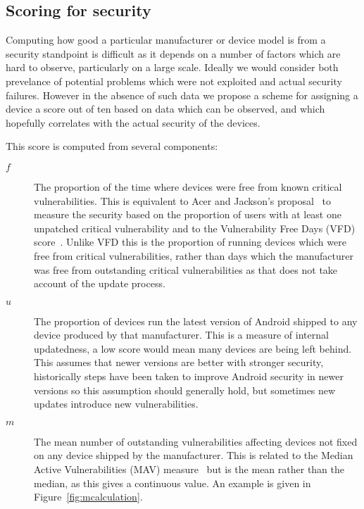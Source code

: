 \subsection{Scoring for security}
\label{sec:security_scoring}

Computing how good a particular manufacturer or device model is from a security standpoint is difficult as it depends on a number of factors which are hard to observe, particularly on a large scale.
Ideally we would consider both prevelance of potential problems which were not exploited and actual security failures.
However in the absence of such data we propose a scheme for assigning a device a score out of ten based on data which can be observed, and which hopefully correlates with the actual security of the devices.

This score is computed from several components:
\begin{description}
  \item[$f$] The proportion of the time where devices were free from known critical vulnerabilities. This is equivalent to Acer and Jackson's proposal~\cite{Acer2010} to measure the security based on the proportion of users with at least one unpatched critical vulnerability and to the Vulnerability Free Days (VFD) score~\cite{Wright2014}.
  Unlike VFD this is the proportion of running devices which were free from critical vulnerabilities, rather than days which the manufacturer was free from outstanding critical vulnerabilities as that does not take account of the update process.
  \item[$u$] The proportion of devices run the latest version of Android shipped to any device produced by that manufacturer. This is a measure of internal updatedness, a low score would mean many devices are being left behind.
  This assumes that newer versions are better with stronger security, historically steps have been taken to improve Android security in newer versions so this assumption should generally hold, but sometimes new updates introduce new vulnerabilities.
  \item[$m$] The mean number of outstanding vulnerabilities affecting devices not fixed on any device shipped by the manufacturer. This is related to the Median Active Vulnerabilities (MAV) measure~\cite{Wright2014} but is the mean rather than the median, as this gives a continuous value.
  An example is given in Figure~\ref{fig:mcalculation}.
\end{description}

